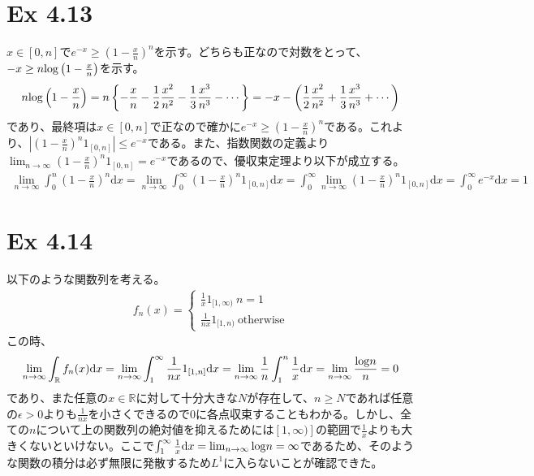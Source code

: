 \documentclass{article}
\begin{document}
\section{Ex 4.13}
$x \in [0, n]$で$e ^{-x} \geq \left( 1 -\frac{x}{n} \right)^n$を示す。どちらも正なので対数をとって、$-x \geq n {\rm log} \left(1-\frac{x}{n} \right)$を示す。
\begin{align*}
	n {\rm log} \left(1-\frac{x}{n} \right) = n \left\{ -\frac{x}{n} - \frac{1}{2} \frac{x^2}{n^2} - \frac{1}{3} \frac{x^3}{n^3} - \cdots \right\} = -x -\left( \frac{1}{2} \frac{x^2}{n^2} + \frac{1}{3} \frac{x^3}{n^3} + \cdots \right)
\end{align*}
であり、最終項は$x\in [0,n]$で正なので確かに$e ^{-x} \geq \left( 1 -\frac{x}{n} \right)^n$である。これより、$\left| \left( 1 -\frac{x}{n} \right)^n 1_{[0, n]} \right| \leq  e^{-x}$である。また、指数関数の定義より$\lim_{n \to \infty} \left( 1 -\frac{x}{n} \right)^n 1_{[0, n]} = e^{-x}$であるので、優収束定理より以下が成立する。
\begin{align*}
	\lim_{n \to \infty} \int _0^n \left( 1 -\frac{x}{n} \right)^n \mathrm{d}x = \lim_{n \to \infty} \int_0^{\infty} \left( 1 -\frac{x}{n} \right)^n 1_{[0, n]} \mathrm{d}x= \int_0^{\infty} \lim_{n \to \infty} \left( 1 -\frac{x}{n} \right)^n 1_{[0, n]} \mathrm{d}x = \int_0^{\infty} e^{-x} \mathrm{d}x = 1
\end{align*}

\section{Ex 4.14}
以下のような関数列を考える。
\begin{align*}
	f_n (x)= \begin{cases}
	\frac{1}{x} 1_{[1, \infty)} \ \text{$n = 1$}\\[8pt]
	\frac{1}{nx} 1_{[1, n)} \ \text{otherwise}
	\end{cases}
\end{align*}
この時、
\begin{align*}
	\lim_{n \to \infty} \int_{\mathbb{R}} f_n (x) \mathrm{d}x = \lim_{n \to \infty} \int_1^{\infty} \frac{1}{nx} 1_{[1, n]} \mathrm{d}x = \lim_{n \to \infty} \frac{1}{n} \int_1^n \frac{1}{x} \mathrm{d}x = \lim_{n\to \infty} \frac{{\rm log} n}{n} = 0
\end{align*}
であり、また任意の$x\in \mathbb{R}$に対して十分大きな$N$が存在して、$n \geq N$であれば任意の$\epsilon > 0$よりも$\frac{1}{nx}$を小さくできるので$0$に各点収束することもわかる。しかし、全ての$n$について上の関数列の絶対値を抑えるためには$[1, \infty)]$の範囲で$\frac{1}{x}$よりも大きくないといけない。ここで$\int_1^{\infty} \frac{1}{x} \mathrm{d}x = \lim_{n \to \infty} {\rm log}n = \infty$であるため、そのような関数の積分は必ず無限に発散するため$L^1$に入らないことが確認できた。
\end{document}
